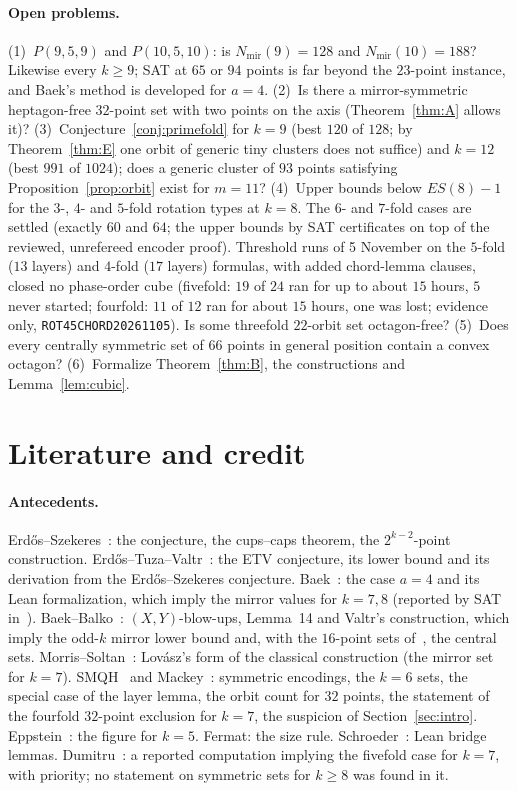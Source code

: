 \documentclass[10pt]{article}
\theoremstyle{definition}
\theoremstyle{remark}
\newcommand{\Nm}{N_{\mathrm{mir}}}
\newcommand{\dirn}[1]{{\upshape\nolinkurl{#1}}}
\begin{document}
\paragraph{Open problems.}
(1)~$P(9,5,9)$ and $P(10,5,10)$: is $\Nm(9)=128$ and $\Nm(10)=188$? Likewise every $k\ge9$; SAT at $65$ or $94$ points is
far beyond the $23$-point instance, and Baek's method is developed for $a=4$. (2)~Is there a mirror-symmetric
heptagon-free $32$-point set with two points on the axis (Theorem~\ref{thm:A} allows it)? (3)~Conjecture~\ref{conj:primefold}
for $k=9$ (best $120$ of $128$; by Theorem~\ref{thm:E} one orbit of generic tiny clusters does not suffice) and $k=12$
(best $991$ of $1024$); does a generic cluster of $93$ points satisfying Proposition~\ref{prop:orbit} exist for $m=11$?
(4)~Upper bounds below $ES(8)-1$ for the $3$-, $4$- and $5$-fold rotation types at $k=8$. The $6$- and $7$-fold cases are
settled (exactly $60$ and $64$; the upper bounds by SAT certificates on top of the reviewed, unrefereed encoder proof).
Threshold runs of 5 November on the $5$-fold ($13$ layers) and $4$-fold ($17$ layers) formulas, with added chord-lemma
clauses, closed no phase-order cube (fivefold: $19$ of $24$ ran for up to about $15$ hours, $5$ never started;
fourfold: $11$ of $12$ ran for about $15$ hours, one was lost; evidence only, \dirn{ROT45CHORD20261105}). Is some threefold $22$-orbit set octagon-free? (5)~Does every centrally symmetric set of $66$ points in general position
contain a convex octagon? (6)~Formalize Theorem~\ref{thm:B}, the constructions and Lemma~\ref{lem:cubic}.

\section{Literature and credit}\label{sec:lit}

\paragraph{Antecedents.} Erd\H{o}s--Szekeres~\cite{ES35,ES61}: the conjecture, the cups--caps theorem, the
$2^{k-2}$-point construction. Erd\H{o}s--Tuza--Valtr~\cite{ETV96}: the ETV conjecture, its lower bound and its derivation
from the Erd\H{o}s--Szekeres conjecture. Baek~\cite{Bae25}: the case $a=4$ and its Lean formalization, which imply the
mirror values for $k=7,8$ (reported by SAT in~\cite{BV15}). Baek--Balko~\cite{BB25}: $(X,Y)$-blow-ups, Lemma~14 and
Valtr's construction, which imply the odd-$k$ mirror lower bound and, with the $16$-point sets of~\cite{SMQH25,Mac25},
the central sets. Morris--Soltan~\cite{MS00}: Lov\'asz's form of the classical construction (the mirror set for $k=7$).
SMQH~\cite{SMQH25} and Mackey~\cite{Mac25}: symmetric encodings, the $k=6$ sets, the special case of the layer lemma, the
orbit count for $32$ points, the statement of the fourfold $32$-point exclusion for $k=7$, the suspicion of
Section~\ref{sec:intro}. Eppstein~\cite{Epp18}: the
figure for $k=5$. Fermat: the size rule. Schroeder~\cite{Sch26}: Lean bridge lemmas. Dumitru~\cite{Dum25}: a reported
computation implying the fivefold case for $k=7$, with priority; no statement on symmetric sets for $k\ge8$ was found in
it.
\end{document}
